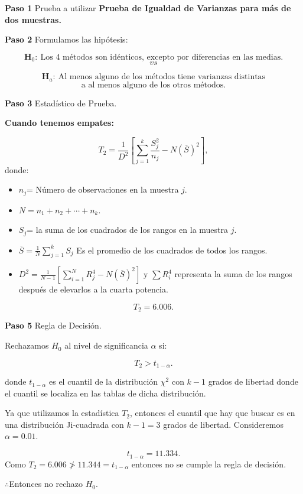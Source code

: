 \documentclass[
  a4paper,
  oneside,
  openany]{book}
\begin{document}
\textbf{Paso 1} Prueba a utilizar \textbf{Prueba de Igualdad de Varianzas para más de dos muestras.}

\textbf{Paso 2} Formulamos las hipótesis:

\[\textbf{H}_0: \ \mbox{Los 4 métodos son idénticos, excepto por diferencias en las medias.}\]
\[vs\]

\[\textbf{H}_a:\ \mbox{Al menos alguno de los métodos tiene varianzas distintas}\]
\[\mbox{a al menos alguno de los otros métodos.}\]

\textbf{Paso 3} Estadístico de Prueba.

\textbf{Cuando tenemos empates:}

\[T_{2}= \frac{1}{D^2}\left[\sum_{j=1}^{k}\frac{S_{j}^2}{n_j}-N(\overline{S})^2\right],\]
donde:

\begin{itemize}
\item
  \(n_{j}\)= Número de observaciones en la muestra \(j\).
\item
  \(N= n_{1}+n_{2}+\cdots+n_{k}\).
\item
  \(S_{j}\)= la suma de los cuadrados de los rangos en la muestra \(j\).
\item
  \(\overline{S}= \frac{1}{N}\sum_{j=1}^{k}S_{j}\) Es el promedio de los cuadrados de todos los rangos.
\item
  \(D^2=\frac{1}{N-1}\left[\sum_{i=1}^{N}R^4_{j}-N(\overline{S})^2\right]\) y \(\sum{R_{i}^4}\) representa la suma de los rangos después de elevarlos a la cuarta potencia.
\end{itemize}

\[T_{2}=6.006.\]

\textbf{Paso 5} Regla de Decisión.

Rechazamos \(H_0\) al nivel de significancia \(\alpha\) si:

\[T_{2}>t_{1-\alpha}.\]

donde \(t_{1-\alpha}\) es el cuantil de la distribución \(\chi^2\) con \(k-1\) grados de libertad donde el cuantil se localiza en las tablas de dicha distribución.

Ya que utilizamos la estadística \(T_2\), entonces el cuantil que hay que buscar es en una distribución Ji-cuadrada con \(k-1=3\) grados de libertad. Consideremos \(\alpha=0.01\).

\[t_{1-\alpha}=11.334.\]
Como \(T_2=6.006 \ngtr 11.344=t_{1-\alpha}\) entonces no se cumple la regla de decisión.

\(\therefore\)Entonces no rechazo \(H_0\).
\end{document}
